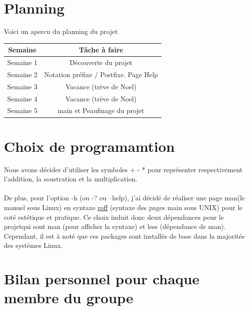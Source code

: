 \documentclass[a4paper,12pt]{report}
\begin{document}
\chapter*{\vspace*{-2em} Planning}

Voici un apercu du planning du projet 

\begin{center}
\begin{tabular}{|c|c|}
\hline
\textbf{Semaine} & \textbf{Tâche à faire} \\ \hline
Semaine 1 & Découverte du projet \\ \hline
Semaine 2 & Notation préfixe / Postfixe. Page Help \\ \hline
Semaine 3 & Vacance (trève de Noel) \\ \hline
Semaine 4 & Vacance (trève de Noel) \\ \hline
Semaine 5 & main et Peaufinage  du projet \\ \hline
\end{tabular}
\end{center}

\chapter*{\vspace*{-2em} Choix de programamtion}

Nous avons décider d'utiliser les symboles + - * pour représenter respectivement l'addition, la soustration et la multiplication. \\ \\
De plus, pour l'option -h (ou -? ou --help), j'ai décidé de réaliser une page man(le manuel sous Linux) en syntaxe \href{https://fr.wikipedia.org/wiki/Roff_(langage_informatique)}{roff} (syntaxe des pages main sous UNIX) pour le coté estétique et pratique. Ce choix induit donc deux dépendances pour le projetqui sont man (pour afficher la syntaxe) et less (dépendance de man). Cependant, il est à noté que ces packages sont installés de base dans la majoritée des systèmes Linux.   

\chapter*{\vspace*{-2em} Bilan personnel pour chaque membre du groupe}
\end{document}
